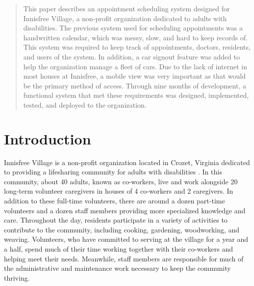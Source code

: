 \documentclass{sig-alternate}
\begin{document}
\maketitle
\begin{abstract}
This paper describes an appointment scheduling system designed for Innisfree Village, a non-profit organization dedicated to adults with disabilities.  The previous system used for scheduling appointments was a handwritten calendar, which was messy, slow, and hard to keep records of.  This system was required to keep track of appointments, doctors, residents, and users of the system.  In addition, a car signout feature was added to help the organization manage a fleet of cars.  Due to the lack of internet in most houses at Innisfree, a mobile view was very important as that would be the primary method of access.  Through nine months of development, a functional system that met these requirements was designed, implemented, tested, and deployed to the organization.
\end{abstract}




\section{Introduction}
Innisfree Village is a non-profit organization located in Crozet, Virginia dedicated to providing a lifesharing community for adults with disabilities \cite{innisfree}. In this community, about 40 adults, known as co-workers, live and work alongside 20 long-term volunteer caregivers in houses of 4 co-workers and 2 caregivers. In addition to these full-time volunteers, there are around a dozen part-time volunteers and a dozen staff members providing more specialized knowledge and care. Throughout the day, residents participate in a variety of activities to contribute to the community, including cooking, gardening, woodworking, and weaving. Volunteers, who have committed to serving at the village for a year and a half, spend much of their time working together with their co-workers and helping meet their needs. Meanwhile, staff members are responsible for much of the administrative and maintenance work necessary to keep the community thriving.
\end{document}
